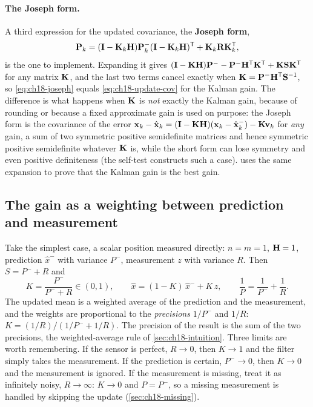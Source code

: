 \paragraph{The Joseph form.}
A third expression for the updated covariance, the \textbf{Joseph
form},
\begin{equation}
  \mathbf{P}_k=(\mathbf{I}-\mathbf{K}_k\mathbf{H})\mathbf{P}^-_k(\mathbf{I}-\mathbf{K}_k\mathbf{H})^{\mathsf{T}}+\mathbf{K}_k\mathbf{R}\mathbf{K}_k^{\mathsf{T}},
  \label{eq:ch18-joseph}
\end{equation}
is the one to implement. Expanding it gives
$(\mathbf{I}-\mathbf{K}\mathbf{H})\mathbf{P}^--\mathbf{P}^-\mathbf{H}^{\mathsf{T}}\mathbf{K}^{\mathsf{T}}+\mathbf{K}\mathbf{S}\mathbf{K}^{\mathsf{T}}$
for any matrix $\mathbf{K}$, and the last two terms cancel exactly when
$\mathbf{K}=\mathbf{P}^-\mathbf{H}^{\mathsf{T}}\mathbf{S}^{-1}$, so \cref{eq:ch18-joseph} equals
\cref{eq:ch18-update-cov} for the Kalman gain. The difference is what happens
when $\mathbf{K}$ is \emph{not} exactly the Kalman gain, because of rounding or
because a fixed approximate gain is used on purpose: the Joseph form is the
covariance of the error
$\mathbf{x}_k-\hat{\mathbf{x}}_k=(\mathbf{I}-\mathbf{K}\mathbf{H})(\mathbf{x}_k-\hat{\mathbf{x}}^-_k)-\mathbf{K}\mathbf{v}_k$
for \emph{any} gain, a sum of two symmetric positive semidefinite matrices
and hence symmetric positive semidefinite whatever $\mathbf{K}$ is, while the
short form can lose symmetry and even positive definiteness (the self-test
constructs such a case).  uses the same expansion
to prove that the Kalman gain is the best gain.

\subsection{The gain as a weighting between prediction and measurement}
\label{sec:ch18-gain}

Take the simplest case, a scalar position measured directly: $n=m=1$,
$\mathbf{H}=1$, prediction $\hat x^-$ with variance $P^-$, measurement $z$ with
variance $R$. Then $S=P^-+R$ and
\begin{equation}
  K=\frac{P^-}{P^-+R}\in(0,1),\qquad
  \hat x=(1-K)\,\hat x^-+K\,z,\qquad
  \frac1P=\frac1{P^-}+\frac1R .
  \label{eq:ch18-gain-1d}
\end{equation}
The updated mean is a weighted average of the prediction and the measurement,
and the weights are proportional to the \emph{precisions} $1/P^-$ and $1/R$:
$K=(1/R)/(1/P^-+1/R)$. The precision of the result is the sum of the two
precisions, the weighted-average rule of \cref{sec:ch18-intuition}.
Three limits are worth remembering. If the sensor is perfect, $R\to0$, then
$K\to1$ and the filter simply takes the measurement. If the prediction is
certain, $P^-\to0$, then $K\to0$ and the measurement is ignored. If the
measurement is missing, treat it as infinitely noisy, $R\to\infty$: $K\to0$
and $P=P^-$, so a missing measurement is handled by skipping the update
(\cref{sec:ch18-missing}).


